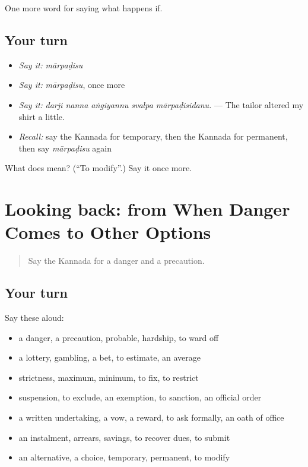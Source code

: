 \begin{grammarlens}[title={What you've built}]
One more word for saying what happens if.
\end{grammarlens}

\subsection*{Your turn}
\begin{itemize}
\raggedright
  \item \emph{Say it:} \emph{mārpaḍisu}
  \item \emph{Say it:} \emph{mārpaḍisu}, once more
  \item \emph{Say it:} \emph{darji nanna aṅgiyannu svalpa mārpaḍisidanu.} — The tailor altered my shirt a little.
  \item \emph{Recall:} say the Kannada for temporary, then the Kannada for permanent, then say \emph{mārpaḍisu} again
\end{itemize}

\begin{tcolorbox}[breakable,colback=teal!4,colframe=teal!35!black,title={Before you move on}]
What does  mean? (\textquotedblleft{}To modify\textquotedblright{}.) Say it once more.
\end{tcolorbox}
\section[(dialogue)]{Looking back: from When Danger Comes to Other Options}

\label{lesson:KA-R418-review-412-418}



\begin{quote}
Say the Kannada for a danger and a precaution.
\end{quote}

\subsection*{Your turn}
Say these aloud:

\begin{itemize}
\raggedright
  \item a danger, a precaution, probable, hardship, to ward off
  \item a lottery, gambling, a bet, to estimate, an average
  \item strictness, maximum, minimum, to fix, to restrict
  \item suspension, to exclude, an exemption, to sanction, an official order
  \item a written undertaking, a vow, a reward, to ask formally, an oath of office
  \item an instalment, arrears, savings, to recover dues, to submit
  \item an alternative, a choice, temporary, permanent, to modify
\end{itemize}

